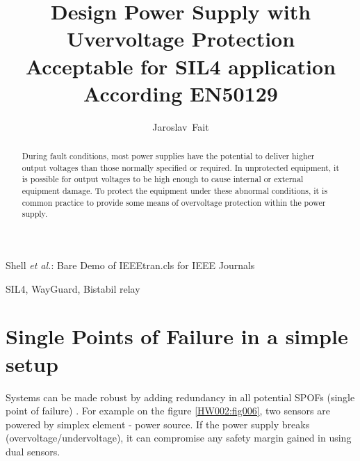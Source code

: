 \documentclass[journal]{IEEEtran}
\begin{document}
%
\title{Design Power Supply with Uvervoltage Protection \\
       Acceptable for SIL4  application According EN50129}

\author{Jaroslav~Fait} 

%
{Shell \MakeLowercase{\textit{et al.}}: Bare Demo of IEEEtran.cls for IEEE Journals}

\maketitle

\begin{abstract}
  During fault conditions, most power supplies have the potential to deliver higher output
  voltages than those normally specified or required. In unprotected equipment, it is possible
  for output voltages to be high enough to cause internal or external equipment damage. To
  protect the equipment under these abnormal conditions, it is common practice to provide
  some means of overvoltage protection within the power supply.
\end{abstract}

\begin{IEEEkeywords}
  SIL4, WayGuard, Bistabil relay
\end{IEEEkeywords}




%
\IEEEpeerreviewmaketitle


\section{Single Points of Failure in a simple setup}
  Systems can be made robust by adding redundancy in all potential SPOFs (single point of failure) 
  \cite{SPOF}. For example on the figure \ref{HW002:fig006}, two sensors are powered by simplex 
  element - power source. If the power supply breaks (overvoltage/undervoltage), it can compromise 
  any safety margin gained in using dual sensors. 
  
\end{document}
